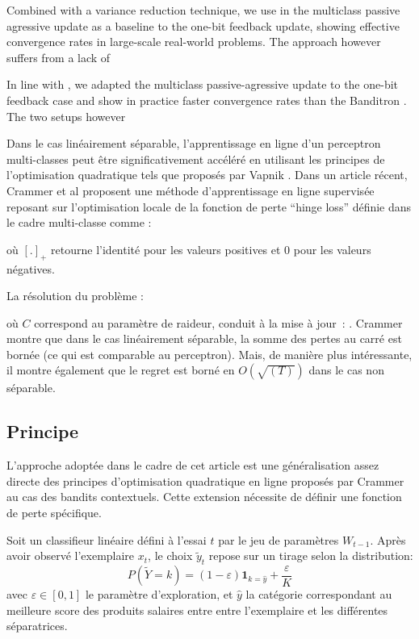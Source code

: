 \documentclass[preprint,12pt,authoryear]{elsarticle}
\begin{document}
Combined with a variance reduction technique, we use in \cite{zhong2015esann} the multiclass passive agressive update as a baseline to the one-bit feedback update, showing effective convergence rates in large-scale real-world problems. The approach however suffers from a lack of 


In line with \cite{kakade2008efficient},  we adapted the multiclass passive-agressive update to the one-bit feedback case  and show in practice faster convergence rates than the Banditron . 
The two setups however 

Dans le cas linéairement séparable, l'apprentissage en ligne d'un perceptron multi-classes peut être significativement accéléré en utilisant les principes de l'optimisation quadratique tels que proposés par Vapnik \cite{vapnik1998statistical}. Dans un article récent, Crammer et al \cite{crammer2006online} proposent une méthode d'apprentissage en ligne supervisée reposant sur l'optimisation locale de la fonction de perte ``hinge loss'' définie dans le cadre multi-classe comme : 

où $[.]_+$ retourne l'identité pour les valeurs positives et 0 pour les valeurs négatives. 

La résolution du problème :

où $C$ correspond au paramètre de raideur, conduit à la mise à jour~:
. Crammer montre que dans le cas linéairement séparable, la somme des pertes au carré est bornée (ce qui est comparable au perceptron). Mais, de manière plus intéressante, il montre également que le regret est  borné en $O(\sqrt{(T)})$ dans le cas non séparable.

  


\subsection{Principe}
L'approche adoptée dans le cadre de cet article est une généralisation assez directe des principes d'optimisation quadratique en ligne proposés par Crammer au cas des bandits contextuels. Cette extension nécessite de définir une fonction de perte spécifique. 

Soit un classifieur linéaire défini à l'essai $t$ par le jeu de paramètres $W_{t-1}$. Après avoir observé l'exemplaire $x_t$, le choix $\tilde{y}_t$ repose sur un tirage selon la distribution: $$P(\tilde{Y}=k) = (1 - \varepsilon) \mathbf{1}_{k = \hat{y}} + \frac{\varepsilon}{K} $$ avec $\varepsilon \in [0,1]$ le paramètre d'exploration, et $\hat{y}$ la catégorie correspondant au meilleure score des produits salaires entre entre l'exemplaire et les différentes séparatrices.  
\end{document}
